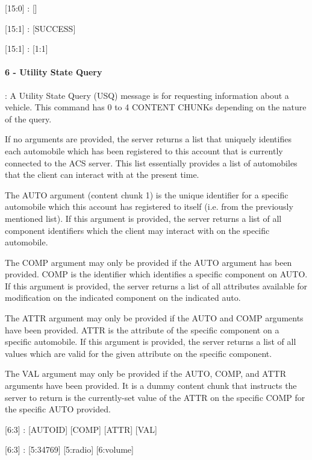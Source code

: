 \begin{center}
{\textsf{[15:0] : []}}

{\textsf{[15:1] : [SUCCESS]}}

{\textsf{[15:1] : [1:1]}}
\end{center}

\paragraph{6 - Utility State Query}: A Utility State Query (USQ) message is for requesting information about a vehicle. This command has 0 to 4 CONTENT CHUNKs depending on the nature of the query.

If no arguments are provided, the server returns a list that uniquely identifies each automobile which has been registered to this account that is currently connected to the ACS server.  This list essentially provides a list of automobiles that the client can interact with at the present time.

The AUTO argument (content chunk 1) is the unique identifier for a specific automobile which this account has registered to itself (i.e. from the previously mentioned list). If this argument is provided, the server returns a list of all component identifiers which the client may interact with on the specific automobile.

The COMP argument may only be provided if the AUTO argument has been provided. COMP is the identifier which identifies a specific component on AUTO. If this argument is provided, the server returns a list of all attributes available for modification on the indicated component on the indicated auto.

The ATTR argument may only be provided if the AUTO and COMP arguments have been provided. ATTR is the attribute of the specific component on a specific automobile. If this argument is provided, the server returns a list of all values which are valid for the given attribute on the specific component.

The VAL argument may only be provided if the AUTO, COMP, and ATTR arguments have been provided. It is a dummy content chunk that instructs the server to return  is the currently-set value of the ATTR on the specific COMP for the specific AUTO provided.

\begin{center}
{\textsf{[6:3] : [AUTOID] [COMP] [ATTR] [VAL]}}

{\textsf{[6:3] : [5:34769] [5:radio] [6:volume]}}
\end{center}

